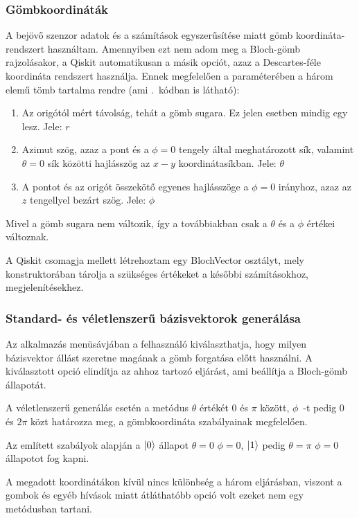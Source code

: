 \documentclass[
]{thesis-ekf}
\theoremstyle{definition}
\theoremstyle{remark}
\begin{document}
\subsubsection{Gömbkoordináták}
A bejövő szenzor adatok és a számítások egyszerűsítése miatt gömb koordináta-rendszert használtam. Amennyiben ezt nem adom meg a Bloch-gömb rajzolásakor, a Qiskit automatikusan a másik opciót, azaz a  Descartes-féle koordináta rendszert használja. Ennek megfelelően a paraméterében a három elemű tömb tartalma rendre (ami \az{\ref{blochspherestart}}.~kódban is látható):

\begin{enumerate}
	\item Az origótól mért távolság, tehát a gömb sugara. Ez jelen esetben mindig egy lesz. Jele: $r$\cite{Dr. Kovács Emőd}
	\item Azimut szög, azaz a pont és a $\phi=0$ tengely által meghatározott sík, valamint $\theta=0$ sík közötti hajlásszög az $x-y$ koordinátasíkban. Jele: $\theta$\cite{Dr. Kovács Emőd}
	\item A pontot és az origót összekötő egyenes hajlásszöge a $\phi=0$ irányhoz, azaz az $z$ tengellyel bezárt szög. Jele: $\phi$\cite{Dr. Kovács Emőd}
\end{enumerate}

Mivel a gömb sugara nem változik, így a továbbiakban csak a $\theta$ és a $\phi$ értékei változnak.

A Qiskit csomagja mellett létrehoztam egy BlochVector osztályt, mely konstruktorában tárolja a szükséges értékeket a későbbi számításokhoz, megjelenítésekhez.

\subsubsection{Standard- és véletlenszerű bázisvektorok generálása}
Az alkalmazás menüsávjában a felhasználó kiválaszthatja, hogy milyen bázisvektor állást szeretne magának a gömb forgatása előtt használni. A kiválasztott opció elindítja az ahhoz tartozó eljárást, ami beállítja a Bloch-gömb állapotát.

A véletlenszerű generálás esetén a metódus $\theta$ értékét 0 és $\pi$ között, $\phi$~-t pedig 0 és $2\pi$ közt határozza meg, a gömbkoordináta szabályainak megfelelően.\cite{Dr. Kovács Emőd}

Az említett szabályok alapján a $\ket{0}$ állapot $\theta=0$ $\phi=0$, $\ket{1}$ pedig $\theta=\pi$ $\phi=0$ állapotot fog kapni.

A megadott koordinátákon kívül nincs különbség a három eljárásban, viszont a gombok és egyéb hívások miatt átláthatóbb opció volt ezeket nem egy metódusban tartani.
\end{document}
